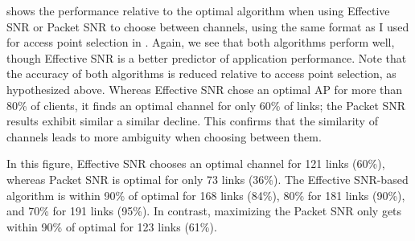  shows the performance relative to the optimal algorithm when using Effective SNR or Packet SNR to choose between channels, using the same format as I used for access point selection in . Again, we see that both algorithms perform well, though Effective SNR is a better predictor of application performance. Note that the accuracy of both algorithms is reduced relative to access point selection, as hypothesized above. Whereas Effective SNR chose an optimal AP for more than 80\% of clients, it finds an optimal channel for only 60\% of links; the Packet SNR results exhibit similar a similar decline. This confirms that the similarity of channels leads to more ambiguity when choosing between them.

In this figure, Effective SNR chooses an optimal channel for 121 links (60\%), whereas Packet SNR is optimal for only 73 links (36\%). The Effective SNR-based algorithm is within 90\% of optimal for 168 links (84\%), 80\% for 181 links (90\%), and 70\% for 191 links (95\%). In contrast, maximizing the Packet SNR only gets within 90\% of optimal for 123 links (61\%).

